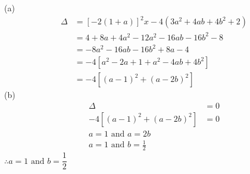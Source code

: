 \documentclass[addpoints, 10pt]{exam}
\begin{document}
\begin{questions}
	\begin{solutionorlines}[20cm]
		(a) 
		\begin{align*}
			\Delta &= [-2(1+a)]^2x-4(3a^2+4ab+4b^2+2) \\
				   &= 4+8a+4a^2-12a^2-16ab-16b^2-8 \\
				   &= -8a^2-16ab-16b^2+8a-4 \\
				   &= -4[a^2-2a+1+a^2-4ab+4b^2] \\
				   &= -4[(a-1)^2+(a-2b)^2]
		\end{align*}
		(b) 
		\begin{align*}
			\Delta &= 0 \\
			-4[(a-1)^2+(a-2b)^2] &= 0 \\
			a = 1 \text{ and } a = 2b \\
			a = 1 \text{ and } b = \tfrac{1}{2}
		\end{align*}
		$\therefore a = 1 \text{ and } b = \dfrac{1}{2}$
	\end{solutionorlines}
\end{questions}
\end{document}
